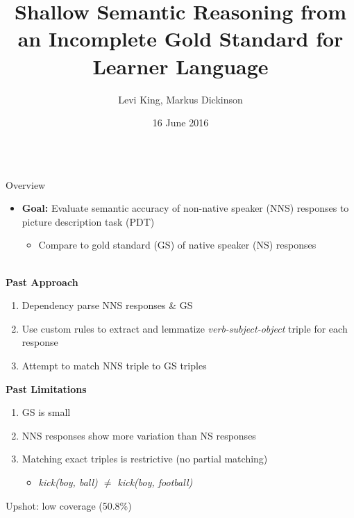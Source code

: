 \documentclass[final,t]{beamer}
\title[]{Shallow Semantic Reasoning from an Incomplete Gold Standard for Learner Language}
\author[]{Levi King, Markus Dickinson}
\institute[]{Indiana University}
\date[]{16 June 2016}
\begin{document}
\begin{frame}{}
\vspace{-1.3em}
  \begin{columns}[t]
    \begin{column}{.33\linewidth}

\begin{block}{Overview}
  \begin{itemize}
    \itemsep1em
  \item{\textbf{Goal:} Evaluate semantic accuracy of non-native speaker (NNS) responses to picture description task (PDT) 
      \begin{itemize}
      \item Compare to gold standard (GS) of native speaker (NS) responses
      \end{itemize}
    }
\end{itemize}
    \begin{center}
      \mbox{}\\[-1em]\textbf{Past Approach}
    \end{center}
      \begin{center}\begin{minipage}{.8\textwidth}
      \begin{enumerate}
      \item Dependency parse NNS responses \& GS
      \item Use custom rules to extract and lemmatize
        \textit{verb-subject-object} triple for each response
      \item Attempt to match NNS triple to GS triples
      \end{enumerate}
      \end{minipage}\end{center}

    \begin{center}
      \textbf{Past Limitations} 
    \end{center}
      \begin{center}\begin{minipage}{.8\textwidth}
      \begin{enumerate}
      \item GS is small
      \item NNS responses show more variation than NS responses
      \item Matching exact triples is restrictive (no partial matching)
        \begin{itemize}
        \item{\textit{kick(boy, ball) $\neq$ kick(boy, football)}}
        \end{itemize}
      \end{enumerate}
      \begin{center}
        Upshot: low coverage (50.8\%)
      \end{center}
      \end{minipage}\end{center}


\end{block}
\end{column}
\end{columns}
\end{frame}
\end{document}
